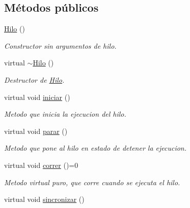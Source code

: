 \subsection*{\-Métodos públicos}
\begin{DoxyCompactItemize}
\item 
\hypertarget{classHilo_a509c256ad0af1b7e4322757d502566b2}{\hyperlink{classHilo_a509c256ad0af1b7e4322757d502566b2}{\-Hilo} ()}\label{classHilo_a509c256ad0af1b7e4322757d502566b2}

\begin{DoxyCompactList}\small\item\em \-Constructor sin argumentos de hilo. \end{DoxyCompactList}\item 
\hypertarget{classHilo_a55cb0cf0942900ab24a5622745b743db}{virtual \hyperlink{classHilo_a55cb0cf0942900ab24a5622745b743db}{$\sim$\-Hilo} ()}\label{classHilo_a55cb0cf0942900ab24a5622745b743db}

\begin{DoxyCompactList}\small\item\em \-Destructor de \hyperlink{classHilo}{\-Hilo}. \end{DoxyCompactList}\item 
\hypertarget{classHilo_ad430a6ca9db5339d53a3bdcd4d0e96e9}{virtual void \hyperlink{classHilo_ad430a6ca9db5339d53a3bdcd4d0e96e9}{iniciar} ()}\label{classHilo_ad430a6ca9db5339d53a3bdcd4d0e96e9}

\begin{DoxyCompactList}\small\item\em \-Metodo que inicia la ejecucion del hilo. \end{DoxyCompactList}\item 
\hypertarget{classHilo_ae631df24234346f7c0899cc2c33eb017}{virtual void \hyperlink{classHilo_ae631df24234346f7c0899cc2c33eb017}{parar} ()}\label{classHilo_ae631df24234346f7c0899cc2c33eb017}

\begin{DoxyCompactList}\small\item\em \-Metodo que pone al hilo en estado de detener la ejecucion. \end{DoxyCompactList}\item 
\hypertarget{classHilo_a187b055e3504487a6bb64340fac2c70d}{virtual void \hyperlink{classHilo_a187b055e3504487a6bb64340fac2c70d}{correr} ()=0}\label{classHilo_a187b055e3504487a6bb64340fac2c70d}

\begin{DoxyCompactList}\small\item\em \-Metodo virtual puro, que corre cuando se ejecuta el hilo. \end{DoxyCompactList}\item 
\hypertarget{classHilo_a0d929d8f8783060a040966c91466025c}{virtual void \hyperlink{classHilo_a0d929d8f8783060a040966c91466025c}{sincronizar} ()}\label{classHilo_a0d929d8f8783060a040966c91466025c}


\end{DoxyCompactItemize}
